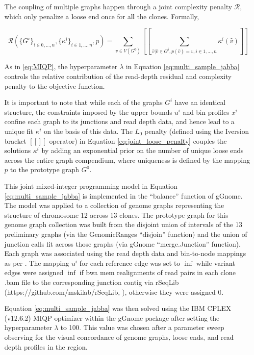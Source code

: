\documentclass[phd,tocprelim]{cornell}
\begin{document}
The coupling of multiple graphs happen through a joint complexity penalty $\mathcal{R}$, which only penalize a loose end once for all the clones. Formally,

\begin{equation} \label{eq:joint_loose_penalty}
    \mathcal{R}(\{G^i\}_{i \in 0, \dots, n}, \{\kappa^i\}_{i \in 1, \dots, n}, p) = \sum_{v \in V(G^0)}[\![ \sum_{\hat{v}|\hat{v} \in G^i, p(\hat{v})=v, i \in 1,\dots,n} \kappa^i(\hat{v}) ]\!]
\end{equation}

As in \ref{eq:MIQP}, the hyperparameter $\lambda$ in Equation \ref{eq:multi_sample_jabba} controls the relative contribution of the read-depth residual and complexity penalty to the objective function. 

It is important to note that while each of the graphs $G^i$ have an identical structure, the constraints imposed by the upper bounds $u^i$ and bin profiles $x^i$ confine each graph to its junctions and read depth data, and hence lead to a unique fit $κ^i$ on the basis of this data. The $L_0$ penalty (defined using the Iversion bracket $[\![]\!]$ operator) in Equation \ref{eq:joint_loose_penalty} couples the solutions $κ^i$ by adding an exponential prior on the number of unique loose ends across the entire graph compendium, where uniqueness is defined by the mapping $p$ to the prototype graph $G^0$.

This joint mixed-integer programming model in Equation \ref{eq:multi_sample_jabba} is implemented in the “balance” function of gGnome. The model was applied to a collection of genome graphs representing the structure of chromosome 12 across 13 clones. The prototype graph for this genome graph collection was built from the disjoint union of intervals of the 13 preliminary graphs (via the GenomicRanges “disjoin” function) and the union of junction calls fit across those graphs (via gGnome “merge.Junction” function). Each graph was associated using the read depth data and bin-to-node mappings as per \cite{Hadi2020-um}. The mapping $u^i$ for each reference edge was set to $\inf$ while variant edges were assigned $\inf$ if bwa mem realignments of read pairs in each clone .bam file to the corresponding junction contig via rSeqLib (https://github.com/mskilab/rSeqLib, \cite{Wala2017-ud}), otherwise they were assigned 0.

Equation \ref{eq:multi_sample_jabba} was then solved using the IBM CPLEX (v12.6.2) MIQP optimizer within the gGnome package after setting the hyperparameter $\lambda$ to 100.  This value was chosen after a parameter sweep observing for the visual concordance of genome graphs, loose ends, and read depth profiles in the region.
\end{document}
